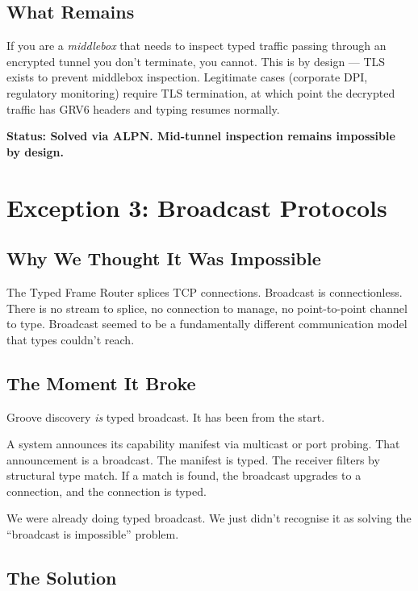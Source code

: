 \documentclass[11pt,a4paper]{article}
\begin{document}
\subsection{What Remains}

If you are a \emph{middlebox} that needs to inspect typed traffic
passing through an encrypted tunnel you don't terminate, you cannot.
This is by design --- TLS exists to prevent middlebox inspection.
Legitimate cases (corporate DPI, regulatory monitoring) require TLS
termination, at which point the decrypted traffic has GRV6 headers
and typing resumes normally.

\textbf{Status: Solved via ALPN. Mid-tunnel inspection remains
impossible by design.}

\section{Exception 3: Broadcast Protocols}
\label{sec:broadcast}

\subsection{Why We Thought It Was Impossible}

The Typed Frame Router splices TCP connections. Broadcast is
connectionless. There is no stream to splice, no connection to manage,
no point-to-point channel to type. Broadcast seemed to be a
fundamentally different communication model that types couldn't reach.

\subsection{The Moment It Broke}

Groove discovery \emph{is} typed broadcast. It has been from the start.

A system announces its capability manifest via multicast or port
probing. That announcement is a broadcast. The manifest is typed. The
receiver filters by structural type match. If a match is found, the
broadcast upgrades to a connection, and the connection is typed.

We were already doing typed broadcast. We just didn't recognise it as
solving the ``broadcast is impossible'' problem.

\subsection{The Solution}
\end{document}
